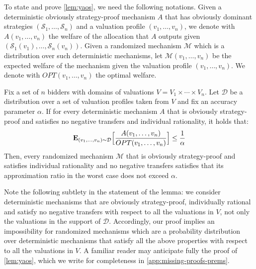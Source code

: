 To state and prove \cref{lem:yaos}, we need the following notations. 
Given a deterministic obviously strategy-proof mechanism $A$ that has obviously dominant strategies $(\mathcal S_1,\allowbreak \ldots, \mathcal S_n)$ and a valuation profile $(v_1,\ldots,v_n)$, we denote with $A(v_1,\ldots,v_n)$ the welfare of the allocation that $A$ outputs given $(\mathcal S_1(v_1),\allowbreak\ldots,\mathcal S_n(v_n))$.
Given a randomized mechanism  $\mathcal M$ 
which is a distribution over such deterministic mechanisms, let $\mathcal M(v_1,\ldots,v_n)$ be the expected welfare of the mechanism given the valuation profile $(v_1,\ldots,v_n)$. 
We denote with $OPT(v_1,\ldots,v_n)$ the optimal welfare.  
\begin{lemma}\label{lem:yaos} \cite{Yao83}
Fix a set of $n$ bidders with domains of valuations $V=V_1\times \cdots \times V_n$.
    Let $\mathcal D$ be a distribution over a set of valuation profiles taken from $V$ and fix an accuracy parameter $\alpha$.
    If for every deterministic mechanism $A$ that is obviously strategy-proof and satisfies no negative transfers and individual rationality, it holds that:
    $$
    \mbox{\bf E}_{(v_1,\ldots,v_n)\sim \mathcal D}\Big[\dfrac{A(v_1,\ldots,v_n)}{OPT(v_1,\ldots,v_n)}\Big] \le  \frac{1}{\alpha}
    $$
Then, every randomized mechanism $\mathcal M$
that is obviously strategy-proof and satisfies individual rationality and no negative transfers
satisfies that its approximation ratio in the worst case does not exceed $\alpha$. 
\end{lemma}
Note the following subtlety in the statement of the lemma: we consider 
deterministic mechanisms that are obviously strategy-proof, individually rational and 
satisfy no negative transfers with respect to all the valuations in $V$, not only the valuations in the support of $\mathcal D$. Accordingly, our proof implies an impossibility for randomized mechanisms which are a probability distribution over deterministic mechanisms that satisfy all the above properties with respect to all the valuations in $V$. 
A familiar reader may anticipate fully the proof of \cref{lem:yaos}, which we write for completeness in \cref{app:missing-proofs-prems}. 



